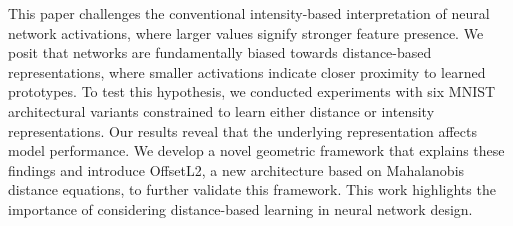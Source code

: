 This paper challenges the conventional intensity-based interpretation of neural network activations, where larger values signify stronger feature presence. We posit that networks are fundamentally biased towards distance-based representations, where smaller activations indicate closer proximity to learned prototypes. To test this hypothesis, we conducted experiments with six MNIST architectural variants constrained to learn either distance or intensity representations. Our results reveal that the underlying representation affects model performance. We develop a novel geometric framework that explains these findings and introduce OffsetL2, a new architecture based on Mahalanobis distance equations, to further validate this framework. This work highlights the importance of considering distance-based learning in neural network design.



